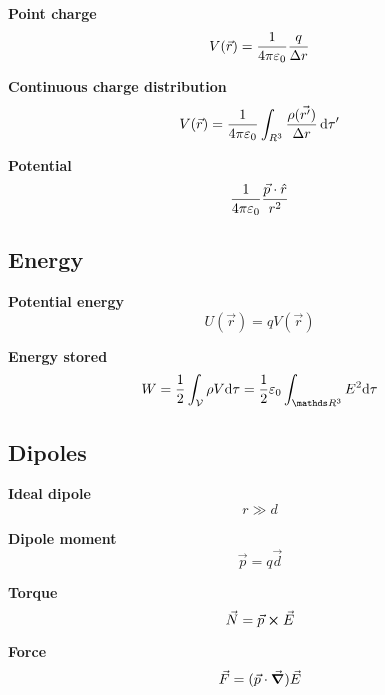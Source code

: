 \documentclass[10pt]{extarticle}
\numberwithin{equation}{section}
\begin{document}
\begin{multicols}{2}
    \textbf{Point charge}
    \begin{equation}
        V(\vec r) = \frac{1}{4 \pi \varepsilon_0} \frac{q}{\Delta r}
    \end{equation}

    \textbf{Continuous charge distribution}
    \begin{equation}
        V(\vec{r}) = \frac{1}{4 \pi \varepsilon_0} \int_{R^3} \frac{\rho(\vec{r'})}{\Delta r} \dd{\tau'}
    \end{equation}

    \textbf{Potential}
    \begin{equation}
        \frac{1}{4 \pi \varepsilon_0} \frac{\vec p \cdot \hat r}{r^2}
    \end{equation}

    \subsection{Energy}

    \textbf{Potential energy}
    \begin{equation}
        U(\vec r) = q V(\vec r)
    \end{equation}

    \textbf{Energy stored}
    \begin{equation}
        W = \half \int_{\mathcal V} \rho V \dd \tau = \half \varepsilon_0 \int_{\R^3} E^2 \dd \tau
    \end{equation}

    \subsection{Dipoles}

    \textbf{Ideal dipole}
    \begin{equation}
        r \gg d
    \end{equation}

    \textbf{Dipole moment}
    \begin{equation}
        \vec p = q \vec d
    \end{equation}

    \textbf{Torque}
    \begin{equation}
        \vec N = \vec p \cross \vec E
    \end{equation}

    \textbf{Force}
    \begin{equation}
        \vec F = (\vec p \cdot \grad) \vec E
    \end{equation}


\end{multicols}
\end{document}
